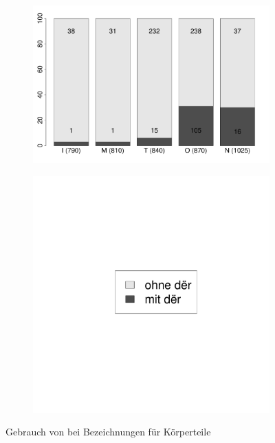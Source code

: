 \begin{figure}
\begin{subfigure}[b]{.6\linewidth}
  \includegraphics[width=10 cm]{generated/images/koerper}
\end{subfigure}%
\begin{subfigure}[b]{.1\linewidth}
  \includegraphics[width=6 cm]{generated/images/ort-legende}
\end{subfigure}

\caption{Gebrauch von  bei Bezeichnungen für Körperteile}
\label{fig:bel-koerper}
\end{figure}

